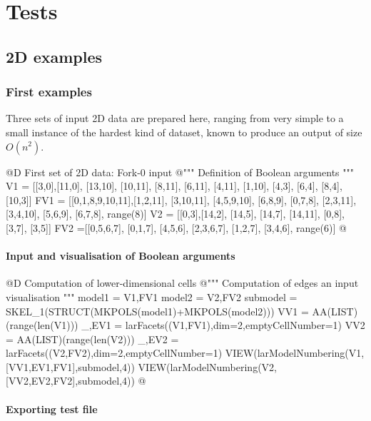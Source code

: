 \documentclass[11pt,oneside]{article}	%
\begin{document}
\section{Tests}

\subsection{2D examples}

\subsubsection{First examples}


Three sets of input 2D data are prepared here, ranging from very simple to a small instance of the hardest kind of dataset, known to produce an output of size $O(n^2)$.


@D First set of 2D data: Fork-0 input
@{""" Definition of Boolean arguments """
V1 = [[3,0],[11,0], [13,10], [10,11], [8,11], [6,11], [4,11], [1,10], [4,3], [6,4], 
	[8,4], [10,3]]
FV1 = [[0,1,8,9,10,11],[1,2,11], [3,10,11], [4,5,9,10], [6,8,9], [0,7,8], [2,3,11],
	[3,4,10], [5,6,9], [6,7,8], range(8)]
V2 = [[0,3],[14,2], [14,5], [14,7], [14,11], [0,8], [3,7], [3,5]]
FV2 =[[0,5,6,7], [0,1,7], [4,5,6], [2,3,6,7], [1,2,7], [3,4,6], range(6)]
@}


\paragraph{Input and visualisation of Boolean arguments}

@D Computation of lower-dimensional cells
@{""" Computation of edges an input visualisation """
model1 = V1,FV1
model2 = V2,FV2
submodel = SKEL_1(STRUCT(MKPOLS(model1)+MKPOLS(model2)))
VV1 = AA(LIST)(range(len(V1)))
_,EV1 = larFacets((V1,FV1),dim=2,emptyCellNumber=1)
VV2 = AA(LIST)(range(len(V2)))
_,EV2 = larFacets((V2,FV2),dim=2,emptyCellNumber=1)
VIEW(larModelNumbering(V1,[VV1,EV1,FV1],submodel,4))
VIEW(larModelNumbering(V2,[VV2,EV2,FV2],submodel,4))
@}

\paragraph{Exporting test file}
\end{document}
